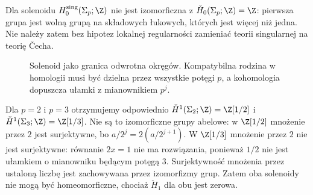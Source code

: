 \begin{wniosek}
Dla solenoidu $H_0^{\mathrm{sing}}(\Sigma_p;\Z)$ nie jest
izomorficzna z $\check H_0(\Sigma_p;\Z)=\Z$:
pierwsza grupa jest wolną grupą na składowych łukowych,
których jest więcej niż jedna. Nie należy zatem bez
hipotez lokalnej regularności zamieniać teorii singularnej
na teorię \v{C}echa.
\end{wniosek}

\begin{figure}[!htbp]
\centering
{}
\caption{Solenoid jako granica odwrotna okręgów.
Kompatybilna rodzina w homologii musi być dzielna
przez wszystkie potęgi $p$, a kohomologia
dopuszcza ułamki z mianownikiem $p^j$.}
\label{fig:cech-solenoid-stopnie}
\end{figure}

\begin{przyklad}
\label{prz:cech-solenoidy-2-3}
Dla $p=2$ i $p=3$ otrzymujemy odpowiednio
$\check H^1(\Sigma_2;\Z)=\Z[1/2]$ i
$\check H^1(\Sigma_3;\Z)=\Z[1/3]$.
Nie są to izomorficzne grupy abelowe:
w $\Z[1/2]$ mnożenie przez $2$ jest surjektywne,
bo $a/2^j=2(a/2^{j+1})$. W $\Z[1/3]$
mnożenie przez $2$ nie jest surjektywne:
równanie $2x=1$ nie ma rozwiązania, ponieważ
$1/2$ nie jest ułamkiem o mianowniku będącym
potęgą $3$. Surjektywność mnożenia przez
ustaloną liczbę jest zachowywana przez
izomorfizmy grup. Zatem oba solenoidy
nie mogą być homeomorficzne, chociaż
$\check H_1$ dla obu jest zerowa.
\end{przyklad}

